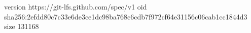 version https://git-lfs.github.com/spec/v1
oid sha256:2efdd80c7c33e6de3ce1dc98ba768c6cdb7f972cf64e31156c06cab1cc1844d3
size 131168
